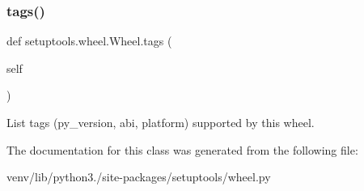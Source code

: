 \subsubsection{\texorpdfstring{tags()}{tags()}}
{\footnotesize\ttfamily def setuptools.\+wheel.\+Wheel.\+tags (\begin{DoxyParamCaption}\item[{}]{self }\end{DoxyParamCaption})}

\begin{DoxyVerb}List tags (py_version, abi, platform) supported by this wheel.\end{DoxyVerb}
 

The documentation for this class was generated from the following file\+:\begin{DoxyCompactItemize}
\item 
venv/lib/python3./site-\/packages/setuptools/wheel.\+py\end{DoxyCompactItemize}
